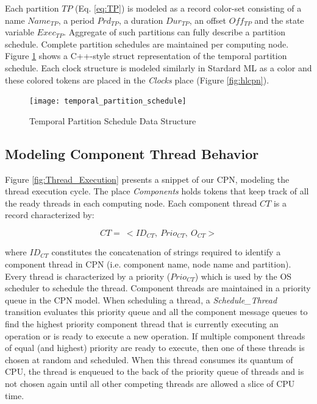 Each partition $TP$ (Eq. \ref{eq:TP}) is modeled as a record color-set consisting of a name $Name_{TP}$, a period $Prd_{TP}$, a duration $Dur_{TP}$, an offset $Off_{TP}$ and the state variable  $Exec_{TP}$. Aggregate of such partitions can fully describe a partition schedule. Complete partition schedules are maintained per computing node. Figure \ref{fig:tps_dt} shows a C++-style struct representation of the temporal partition schedule. Each clock structure is modeled similarly in Stardard ML as a color and these colored tokens are placed in the \emph{Clocks} place (Figure \ref{fig:hlcpn}). 

\begin{figure}[h]
	\centering
	\texttt{[image: temporal\_partition\_schedule]}
	\caption{Temporal Partition Schedule Data Structure}
	\label{fig:tps_dt}
\end{figure}

\subsection{Modeling Component Thread Behavior}

Figure \ref{fig:Thread_Execution} presents a snippet of our CPN, modeling the thread execution cycle. The place \emph{Components} holds tokens that keep track of all the ready threads in each computing node. Each component thread $CT$ is a record characterized by:

\begin{equation}
\label{eq:CT}
CT = \ <ID_{CT}, \ Prio_{CT}, \ O_{CT}>
\end{equation}

where $ID_{CT}$ constitutes the concatenation of strings required to identify a component thread in CPN (i.e. component name, node name and partition). Every thread is characterized by a priority ($Prio_{CT}$) which is used by the OS scheduler to schedule the thread. Component threads are maintained in a priority queue in the CPN model. When scheduling a thread, a \emph{Schedule\_Thread} transition evaluates this priority queue and all the component message queues to find the highest priority component thread that is currently executing an operation or is ready to execute a new operation. If multiple component threads of equal (and highest) priority are ready to execute, then one of these threads is chosen at random and scheduled. When this thread consumes its quantum of CPU, the thread is enqueued to the back of the priority queue of threads and is not chosen again until all other competing threads are allowed a slice of CPU time. 


